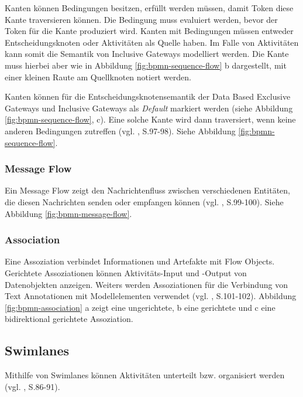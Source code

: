 Kanten können Bedingungen besitzen, erfüllt werden müssen, damit Token diese Kante traversieren können. Die Bedingung muss evaluiert werden, bevor der Token für die Kante produziert wird. Kanten mit Bedingungen müssen entweder Entscheidungsknoten oder Aktivitäten als Quelle haben. Im Falle von Aktivitäten kann somit die Semantik von Inclusive Gateways modelliert werden. Die Kante muss hierbei aber wie in Abbildung \ref{fig:bpmn-sequence-flow} b dargestellt, mit einer kleinen Raute am Quellknoten notiert werden.

Kanten können für die Entscheidungsknotensemantik der Data Based Exclusive Gateways und Inclusive Gateways als \emph{Default} markiert werden  (siehe Abbildung \ref{fig:bpmn-sequence-flow}, c). Eine solche Kante wird dann traversiert, wenn keine anderen Bedingungen zutreffen (vgl. \citep{BPMN2009}, S.97-98). Siehe Abbildung \ref{fig:bpmn-sequence-flow}.

\subsubsection{Message Flow}
Ein Message Flow zeigt den Nachrichtenfluss zwischen verschiedenen Entitäten, die diesen Nachrichten senden oder empfangen können (vgl. \citep{BPMN2009}, S.99-100). Siehe Abbildung \ref{fig:bpmn-message-flow}.

\subsubsection{Association}
Eine Assoziation verbindet Informationen und Artefakte mit Flow Objects. Gerichtete Assoziationen können Aktivitäts-Input und -Output von Datenobjekten anzeigen. Weiters werden Assoziationen für die Verbindung von Text Annotationen mit Modellelementen verwendet (vgl. \citep{BPMN2009}, S.101-102). Abbildung \ref{fig:bpmn-association} a zeigt eine ungerichtete, b eine gerichtete und c eine bidirektional gerichtete Assoziation.


\subsection{Swimlanes}
Mithilfe von Swimlanes können Aktivitäten unterteilt bzw. organisiert werden (vgl. \citep{BPMN2009}, S.86-91).


